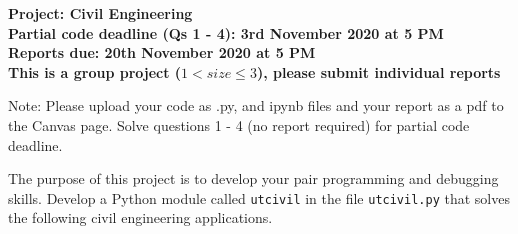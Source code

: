 \documentclass[a4paper,12pt]{article}
\begin{document}
\begin{centering}
	\textbf{
		Project: Civil Engineering\\
		Partial code deadline (Qs 1 - 4): 3rd November 2020 at 5 PM\\
		Reports due: 20th November 2020 at 5 PM\\
		This is a group project ($ 1 < size \le 3$), please submit individual reports\\
	}
\end{centering}


\vspace{1em}

Note: Please upload your code as .py, and ipynb files and your report as a pdf to the Canvas page. Solve questions 1 - 4 (no report required) for partial code deadline.

\vspace{1em}
 
 The purpose of this project is to develop your pair programming and debugging skills. Develop a Python module called \verb|utcivil| in the file  \verb|utcivil.py| that solves the following civil engineering applications.
 
\end{document}
